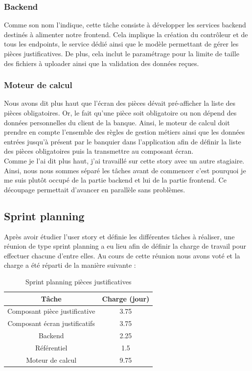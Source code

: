 	\subsubsection{Backend}
	Comme son nom l'indique, cette tâche consiste à développer les services backend destinés à alimenter notre frontend. Cela implique la création du contrôleur et de tous les endpoints, le service dédié ainsi que le modèle permettant de gérer les pièces justificatives. De plus, cela inclut le paramétrage pour la limite de taille des fichiers à uploader ainsi que la validation des données reçues.
	
	\subsubsection{Moteur de calcul}
	Nous avons dit plus haut que l'écran des pièces dévait pré-afficher la liste des pièces obligatoires. Or, le fait qu'une pièce soit obligatoire ou non dépend des données personnelles du client de la banque. Ainsi, le moteur de calcul doit prendre en compte l'ensemble des règles de gestion métiers ainsi que les données entrées jusqu'à présent par le banquier dans l'application afin de définir la liste des pièces obligatoires puis la transmettre au composant écran. \\
	
	Comme je l'ai dit plus haut, j'ai travaillé sur cette story avec un autre stagiaire. Ainsi, nous nous sommes séparé les tâches avant de commencer c'est pourquoi je me suis plutôt occupé de la partie backend et lui de la partie frontend. Ce découpage permettait d'avancer en parallèle sans problèmes. \\
	
\subsection{Sprint planning}
	Après avoir étudier l'user story et définie les différentes tâches à réaliser, une réunion de type sprint planning a eu lieu afin de définir la charge de travail pour effectuer chacune d'entre elles. Au cours de cette réunion nous avons voté et la charge a été réparti de la manière suivante :
	
\begin{table}[h!]
	\center
	\begin{tabular}{| c | c |}
     \hline
     Tâche & Charge (jour) \\ \hline
     Composant pièce justificative & 3.75\\ \hline
     Composant écran justificatifs & 3.75\\ \hline
     Backend & 2.25\\ \hline
     Référentiel & 1.5\\ \hline
     Moteur de calcul & 9.75\\
     \hline
	\end{tabular}
	\caption{Sprint planning pièces justificatives}
	\label{sprintPlanningPJ}
\end{table}

